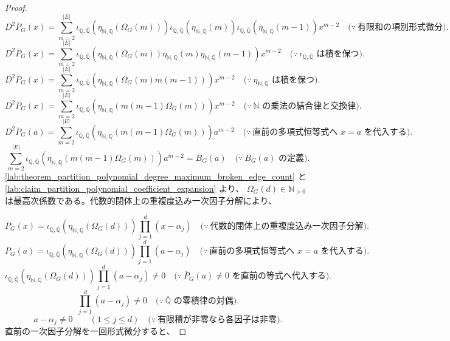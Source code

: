 \documentclass[11pt,a4paper]{article}
\theoremstyle{remark}
\begin{document}
\begin{proof}
\[D^2\overline P_G(x)
=
\sum_{m=2}^{|E|}
\iota_{\mathbb Q,\overline{\mathbb Q}}\!\left(
  \eta_{\mathbb N,\mathbb Q}\!\left(\Omega_G(m)\right)
\right)
\iota_{\mathbb Q,\overline{\mathbb Q}}\!\left(
  \eta_{\mathbb N,\mathbb Q}(m)
\right)
\iota_{\mathbb Q,\overline{\mathbb Q}}\!\left(
  \eta_{\mathbb N,\mathbb Q}(m-1)
\right)
x^{m-2}
\quad\bigl(\because\ \text{有限和の項別形式微分}\bigr).\]
\[D^2\overline P_G(x)
=
\sum_{m=2}^{|E|}
\iota_{\mathbb Q,\overline{\mathbb Q}}\!\left(
  \eta_{\mathbb N,\mathbb Q}\!\left(\Omega_G(m)\right)
  \eta_{\mathbb N,\mathbb Q}(m)
  \eta_{\mathbb N,\mathbb Q}(m-1)
\right)
x^{m-2}
\quad\bigl(\because\ \iota_{\mathbb Q,\overline{\mathbb Q}}\text{ は積を保つ}\bigr).\]
\[D^2\overline P_G(x)
=
\sum_{m=2}^{|E|}
\iota_{\mathbb Q,\overline{\mathbb Q}}\!\left(
  \eta_{\mathbb N,\mathbb Q}\!\left(\Omega_G(m)m(m-1)\right)
\right)
x^{m-2}
\quad\bigl(\because\ \eta_{\mathbb N,\mathbb Q}\text{ は積を保つ}\bigr).\]
\[D^2\overline P_G(x)
=
\sum_{m=2}^{|E|}
\iota_{\mathbb Q,\overline{\mathbb Q}}\!\left(
  \eta_{\mathbb N,\mathbb Q}\!\left(m(m-1)\Omega_G(m)\right)
\right)
x^{m-2}
\quad\bigl(\because\ \mathbb N\text{ の乗法の結合律と交換律}\bigr).\]
\[D^2\overline P_G(a)
=
\sum_{m=2}^{|E|}
\iota_{\mathbb Q,\overline{\mathbb Q}}\!\left(
  \eta_{\mathbb N,\mathbb Q}\!\left(m(m-1)\Omega_G(m)\right)
\right)
a^{m-2}
\quad\bigl(\because\ \text{直前の多項式恒等式へ }x=a\text{ を代入する}\bigr).\]
\[\sum_{m=2}^{|E|}
\iota_{\mathbb Q,\overline{\mathbb Q}}\!\left(
  \eta_{\mathbb N,\mathbb Q}\!\left(m(m-1)\Omega_G(m)\right)
\right)
a^{m-2}
=B_G(a)
\quad\bigl(\because\ B_G(a)\text{ の定義}\bigr).\]
\cref{lab:theorem_partition_polynomial_degree_maximum_broken_edge_count}
 と
\cref{lab:claim_partition_polynomial_coefficient_expansion}
 より、
$\Omega_G(d)\in\mathbb N_{>0}$
 は最高次係数である。代数的閉体上の重複度込み一次因子分解により、

\[\overline P_G(x)
=
\iota_{\mathbb Q,\overline{\mathbb Q}}\!\left(
  \eta_{\mathbb N,\mathbb Q}\!\left(\Omega_G(d)\right)
\right)
\prod_{j=1}^{d}(x-\alpha_j)
\quad\bigl(\because\ \text{代数的閉体上の重複度込み一次因子分解}\bigr).\]
\[\overline P_G(a)
=
\iota_{\mathbb Q,\overline{\mathbb Q}}\!\left(
  \eta_{\mathbb N,\mathbb Q}\!\left(\Omega_G(d)\right)
\right)
\prod_{j=1}^{d}(a-\alpha_j)
\quad\bigl(\because\ \text{直前の多項式恒等式へ }x=a\text{ を代入する}\bigr).\]
\[\iota_{\mathbb Q,\overline{\mathbb Q}}\!\left(
  \eta_{\mathbb N,\mathbb Q}\!\left(\Omega_G(d)\right)
\right)
\prod_{j=1}^{d}(a-\alpha_j)
\ne0
\quad\bigl(\because\ \overline P_G(a)\ne0\text{ を直前の等式へ代入する}\bigr).\]
\[\prod_{j=1}^{d}(a-\alpha_j)
\ne0
\quad\bigl(\because\ \overline{\mathbb Q}\text{ の零積律の対偶}\bigr).\]
\[a-\alpha_j
\ne0
\qquad(1\le j\le d)
\quad\bigl(\because\ \text{有限積が非零なら各因子は非零}\bigr).\]
直前の一次因子分解を一回形式微分すると、


\end{proof}
\end{document}
